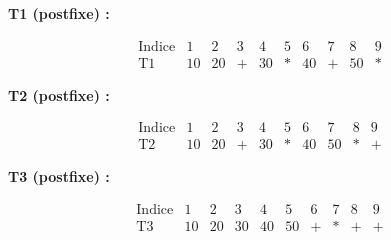 \documentclass{article}
\begin{document}
\renewcommand{\arraystretch}{1.3}

\textbf{T1 (postfixe) :}

\[
\begin{array}{c|*{9}{c}}
\text{Indice} & 1 & 2 & 3 & 4 & 5 & 6 & 7 & 8 & 9\\ \hline
\text{T1} & 10 & 20 & + & 30 & * & 40 & + & 50 & *
\end{array}
\]

\textbf{T2 (postfixe) :}

\[
\begin{array}{c|*{17}{c}}
\text{Indice} & 1 & 2 & 3 & 4 & 5 & 6 & 7 & 8 & 9\\ \hline
\text{T2} & 10 & 20 & + & 30 & * & 40 & 50 & * & +
\end{array}
\]

\textbf{T3 (postfixe) :}

\[
\begin{array}{c|*{17}{c}}
\text{Indice} & 1 & 2 & 3 & 4 & 5 & 6 & 7 & 8 & 9\\ \hline
\text{T3} & 10 & 20 & 30 & 40 & 50 & + & * & + & +
\end{array}
\]
\end{document}

